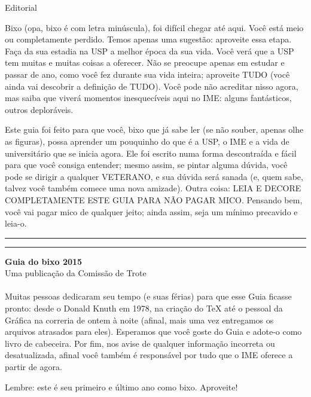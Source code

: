 \begin{editorial}{Editorial}

Bixo (opa, bixo é com letra minúscula), foi difícil chegar até aqui. Você está
meio ou completamente perdido. Temos apenas uma sugestão: aproveite essa etapa.
Faça da sua estadia na USP a melhor época da sua vida. Você verá que a USP tem
muitas e muitas coisas a oferecer. Não se preocupe apenas em estudar e passar de
ano, como você fez durante sua vida inteira; aproveite TUDO (você ainda vai
descobrir a definição de TUDO). Você pode não acreditar nisso agora, mas saiba
que viverá momentos inesquecíveis aqui no IME: alguns fantásticos, outros deploráveis.

Este guia foi feito para que você, bixo que já sabe ler (se não souber, apenas olhe
as figuras), possa aprender um pouquinho do que é a USP, o IME e a vida de
universitário que se inicia agora. Ele foi escrito numa forma descontraída e
fácil para que você consiga entender; mesmo assim, se pintar alguma dúvida,
você pode se dirigir a qualquer VETERANO, e sua dúvida será sanada (e, quem sabe,
talvez você também comece uma nova amizade). Outra coisa: LEIA E DECORE
COMPLETAMENTE ESTE GUIA PARA NÃO PAGAR MICO. Pensando bem, você vai pagar mico
de qualquer jeito; ainda assim, seja um mínimo precavido e leia-o.


\rule{\textwidth}{0.5ex}\rule{2ex}{0.5ex}

{\large\bf Guia do bixo 2015} \\
Uma publicação da Comissão de Trote

\paragraph{}
Muitas pessoas dedicaram seu tempo (e suas férias) para que esse Guia ficasse pronto: desde o
Donald Knuth em 1978, na criação do \TeX\makebox{} até o pessoal da Gráfica na correria de
ontem à noite (afinal, mais uma vez entregamos os arquivos atrasados para eles).
Esperamos que você goste do Guia e adote-o como livro de cabeceira. Por fim,
nos avise de qualquer informação incorreta ou desatualizada, afinal você também é
responsável por tudo que o IME oferece a partir de agora.

Lembre: este é seu primeiro e último ano como bixo. Aproveite!


\end{editorial}
